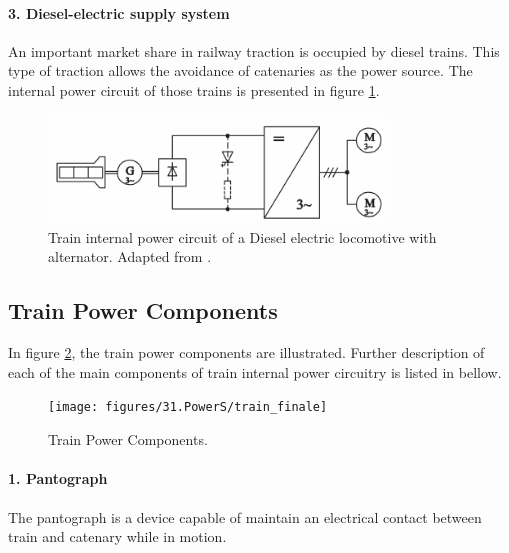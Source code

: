 \paragraph{3. Diesel-electric supply system\\}

An important market share in railway traction is occupied by diesel trains. This type of traction allows the avoidance of catenaries as the power source. The internal power circuit of those trains is presented in figure \ref{fig:steimel2008c}.

\begin{figure}[h!]
	\centering
	\begin{minipage}{.6\textwidth}
		\centering
		\includegraphics[width=0.8\textwidth,keepaspectratio]{figures/31.PowerS/steimel2008c}
		\caption{Train internal power circuit of a Diesel electric locomotive with alternator. Adapted from \cite{steimel2008}.}
		\label{fig:steimel2008c}
	\end{minipage}
\end{figure}

\newpage
\subsection{Train Power Components}
\label{subs:314}

In figure \ref{fig:train_finale}, the train power components are illustrated. Further description of each of the main components of train internal power circuitry is listed in bellow.


\begin{figure}[h!]
	\centering
	\texttt{[image: figures/31.PowerS/train\_finale]}
	\caption{Train Power Components.}
	\label{fig:train_finale}
\end{figure}

\paragraph{1. Pantograph\\}

	The pantograph is a device capable of maintain an electrical contact between train and catenary while in motion.
	
